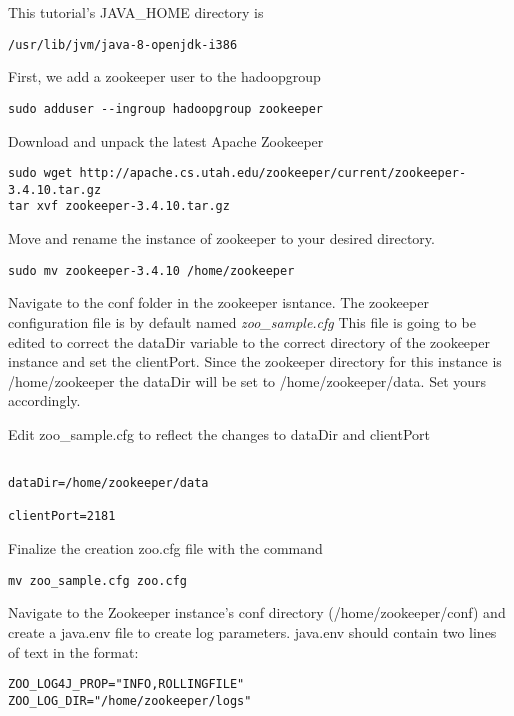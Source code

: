 This tutorial's JAVA\_HOME directory is

\begin{lstlisting}
/usr/lib/jvm/java-8-openjdk-i386
\end{lstlisting}

First, we add a zookeeper user to the hadoopgroup

\begin{lstlisting}
sudo adduser --ingroup hadoopgroup zookeeper
\end{lstlisting}

Download and unpack the latest Apache Zookeeper

\begin{lstlisting}
sudo wget http://apache.cs.utah.edu/zookeeper/current/zookeeper-3.4.10.tar.gz
tar xvf zookeeper-3.4.10.tar.gz
\end{lstlisting}

Move and rename the instance of zookeeper to your desired directory.

\begin{lstlisting}
sudo mv zookeeper-3.4.10 /home/zookeeper
\end{lstlisting}

Navigate to the conf folder in the zookeeper isntance. The zookeeper
configuration file is by default named \emph{zoo\_sample.cfg} This file
is going to be edited to correct the dataDir variable to the correct
directory of the zookeeper instance and set the clientPort. Since the
zookeeper directory for this instance is /home/zookeeper the dataDir
will be set to /home/zookeeper/data. Set yours accordingly.

Edit zoo\_sample.cfg to reflect the changes to dataDir and clientPort

\begin{lstlisting}

dataDir=/home/zookeeper/data

clientPort=2181
\end{lstlisting}

Finalize the creation zoo.cfg file with the command

\begin{lstlisting}
mv zoo_sample.cfg zoo.cfg
\end{lstlisting}

Navigate to the Zookeeper instance's conf directory
(/home/zookeeper/conf) and create a java.env file to create log
parameters. java.env should contain two lines of text in the format:

\begin{lstlisting}
ZOO_LOG4J_PROP="INFO,ROLLINGFILE"
ZOO_LOG_DIR="/home/zookeeper/logs"
\end{lstlisting}

